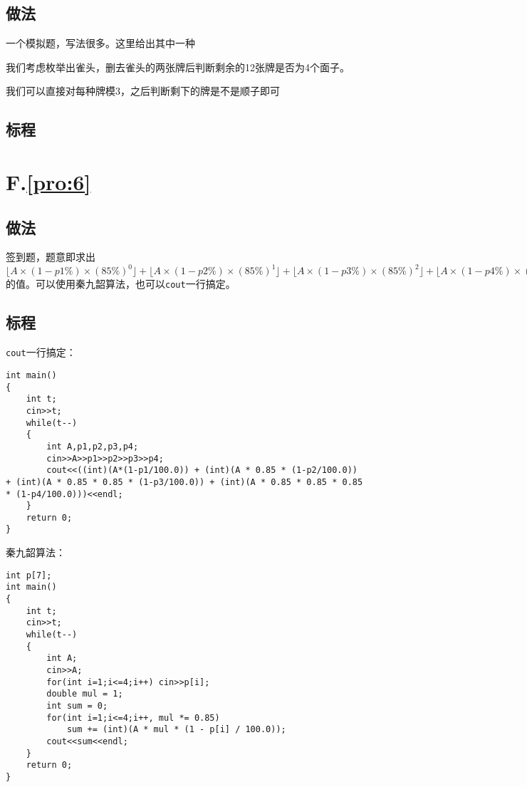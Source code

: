 \documentclass[
	lang=cn,
	color=blue
]{elegantbook}
\begin{document}
\section*{做法}

一个模拟题，写法很多。这里给出其中一种

我们考虑枚举出雀头，删去雀头的两张牌后判断剩余的12张牌是否为4个面子。

我们可以直接对每种牌模3，之后判断剩下的牌是不是顺子即可

\section*{标程}

\chapter*{F.\quad \ref*{pro:6}}
\section*{做法}
签到题，题意即求出$\lfloor A \times (1-p1\%) \times (85\%)^0 \rfloor + \lfloor A \times (1-p2\%) \times (85\%)^1 \rfloor + \lfloor A \times (1-p3\%) \times (85\%)^2 \rfloor + \lfloor A \times (1-p4\%) \times (85\%)^3 \rfloor$的值。可以使用秦九韶算法，也可以\lstinline{cout}一行搞定。

\section*{标程}
\lstinline{cout}一行搞定：
\begin{lstlisting}
int main()
{
    int t;
    cin>>t;
    while(t--)
    {
        int A,p1,p2,p3,p4;
        cin>>A>>p1>>p2>>p3>>p4;
        cout<<((int)(A*(1-p1/100.0)) + (int)(A * 0.85 * (1-p2/100.0)) + (int)(A * 0.85 * 0.85 * (1-p3/100.0)) + (int)(A * 0.85 * 0.85 * 0.85 * (1-p4/100.0)))<<endl;
    }
    return 0;
}
\end{lstlisting}

秦九韶算法：
\begin{lstlisting}
int p[7];
int main()
{
    int t;
    cin>>t;
    while(t--)
    {
        int A;
        cin>>A;
        for(int i=1;i<=4;i++) cin>>p[i];
        double mul = 1;
        int sum = 0;
        for(int i=1;i<=4;i++, mul *= 0.85)
            sum += (int)(A * mul * (1 - p[i] / 100.0));
        cout<<sum<<endl;
    }
    return 0;
}
\end{lstlisting}
\end{document}
